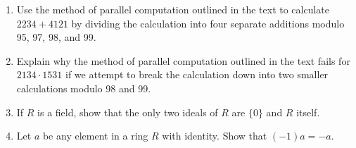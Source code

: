 {\begin{enumerate}
\begin{multicols}{2}
\begin{enumerate}
\item
\begin{align*}
x & \equiv  3 \pmod{7} \\
x & \equiv  0 \pmod{8} \\
x & \equiv  5 \pmod{15} 
\end{align*}

\item
\begin{align*}
x & \equiv  2 \pmod{4} \\
x & \equiv  4 \pmod{7} \\
x & \equiv  7 \pmod{9} \\
x & \equiv  5 \pmod{11} 
\end{align*}

\item
\begin{align*}
x & \equiv  3 \pmod{5} \\
x & \equiv  0 \pmod{8} \\
x & \equiv  1 \pmod{11} \\
x & \equiv  5 \pmod{13} 
\end{align*}


\end{enumerate}
\end{multicols}
 

 
 
 
\item  %
Use the method of parallel computation outlined in the text to
calculate $2234 + 4121$ by dividing the calculation 
into four separate additions modulo 95, 97, 98, and 99. 
 
\item
Explain why the method of parallel computation outlined in the text
fails for $2134 \cdot 1531$ if we attempt to break the calculation
down into two smaller calculations modulo 98 and 99.
 
 
\item
If $R$ is a field,
 show that the only two ideals of $R$ are $\{ 0 \}$
and $R$ itself.
 
 
\item
Let $a$ be any element in a ring $R$ with identity. Show that $(-1)a=
-a$. 
 
 
 

\end{enumerate}}
